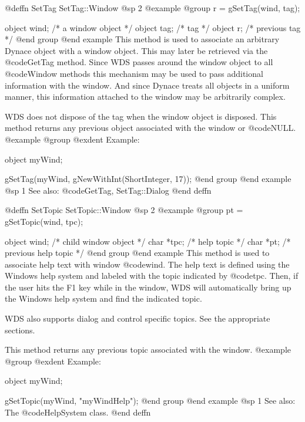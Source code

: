 @deffn {SetTag} SetTag::Window
@sp 2
@example
@group
r = gSetTag(wind, tag);

object  wind;   /*  a window object   */
object  tag;    /*  tag               */
object  r;      /*  previous tag      */
@end group
@end example
This method is used to associate an arbitrary Dynace object with a
window object.  This may later be retrieved via the @code{GetTag} method.
Since WDS passes around the window object to all @code{Window} methods
this mechanism may be used to pass additional information with the
window.  And since Dynace treats all objects in a uniform manner, this
information attached to the window may be arbitrarily complex.

WDS does not dispose of the tag when the window object is disposed.
This method returns any previous object associated with the window or
@code{NULL}.
@example
@group
@exdent Example:

object  myWind;

gSetTag(myWind, gNewWithInt(ShortInteger, 17));
@end group
@end example
@sp 1
See also:  @code{GetTag, SetTag::Dialog}
@end deffn












@deffn {SetTopic} SetTopic::Window
@sp 2
@example
@group
pt = gSetTopic(wind, tpc);

object  wind;   /*  child window object   */
char    *tpc;   /*  help topic            */
char    *pt;    /*  previous help topic   */
@end group
@end example
This method is used to associate help text with window @code{wind}.
The help text is defined using the Windows help system and labeled
with the topic indicated by @code{tpc}.  Then, if the user hits
the F1 key while in the window, WDS will automatically bring up
the Windows help system and find the indicated topic.

WDS also supports dialog and control specific topics.  See the appropriate
sections.

This method returns any previous topic associated with the window.
@example
@group
@exdent Example:

object  myWind;

gSetTopic(myWind, "myWindHelp");
@end group
@end example
@sp 1
See also:  The @code{HelpSystem} class.
@end deffn













